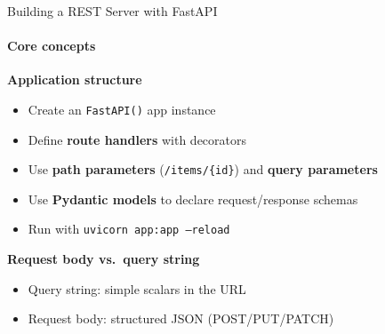 \documentclass[aspectratio=169]{beamer}
\begin{document}
\begin{frame}[t]{Building a REST Server with FastAPI}
\framesubtitle{Core concepts}
        \textbf{Application structure}
        \begin{itemize}
            \item Create an \texttt{FastAPI()} app instance
            \item Define \textbf{route handlers} with decorators
            \item Use \textbf{path parameters} (\texttt{/items/\{id\}}) and \textbf{query parameters}
            \item Use \textbf{Pydantic models} to declare request/response schemas
            \item Run with \texttt{uvicorn app:app --reload}
        \end{itemize}
        \vspace{3mm}
        \textbf{Request body vs.~query string}
        \begin{itemize}
            \item Query string: simple scalars in the URL
            \item Request body: structured JSON (POST/PUT/PATCH)
        \end{itemize}
\end{frame}
\end{document}
